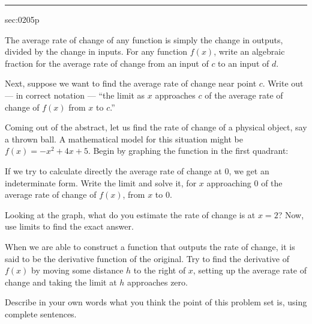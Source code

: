 \renewcommand{\columnseprule}{1.5pt}
\begin{multicols*}{2}
\rule[0.5\baselineskip]{0.4\textwidth}{1pt}
\noindent
{}\label{sec:0205p}
\begin{exercises}{sec:0205p}

\lab{} The average rate of change of any function is simply the change in outputs, divided by the change in inputs.  For any function $f(x)$, write an algebraic fraction for the average rate of change from an input of $c$ to an input of $d$.

\vspace{3cm}
\lab{} Next, suppose we want to find the average rate of change near point $c$.  Write out --- in correct notation --- ``the limit as $x$ approaches $c$ of the average rate of change of $f(x)$ from $x$ to $c$.''


\vspace{3cm}
\lab{} Coming out of the abstract, let us find the rate of change of a physical object, say a thrown ball.  A mathematical model for this situation might be $f(x)=-x^2+4x+5$.  Begin by graphing the function in the first quadrant:

\noindent
{}

\vspace{1cm}

\lab{}  If we try to calculate directly the average rate of change at 0, we get an indeterminate form.  Write the limit and solve it, for $x$ approaching 0 of the average rate of change of $f(x)$, from $x$ to 0.


\vspace{3cm}
\lab{} Looking at the graph, what do you estimate the rate of change is at $x=2$?  Now, use limits to find the exact answer.


\vspace{3cm}
\lab{}   When we are able to construct a function that outputs the rate of change, it is said to be the derivative function of the original.  Try to find the derivative of $f(x)$ by moving some distance $h$ to the right of $x$, setting up the average rate of change and taking the limit at $h$ approaches zero.


\vspace{5cm}
\lab{}  Describe in your own words what you think the point of this problem set is, using complete sentences.

\end{exercises}
\end{multicols*}